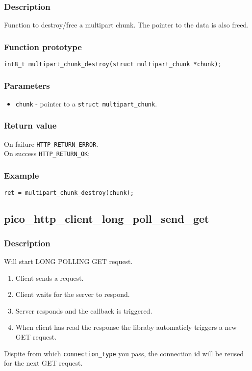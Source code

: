 \subsubsection*{Description}
Function to destroy/free a multipart chunk. The pointer to the data is also freed.

\subsubsection*{Function prototype}
\texttt{int8\_t multipart\_chunk\_destroy(struct multipart\_chunk *chunk);}

\subsubsection*{Parameters}
\begin{itemize}[noitemsep]
\item \texttt{chunk} - pointer to a \texttt{struct multipart\_chunk}.
\end{itemize}
\subsubsection*{Return value}
On failure \texttt{HTTP\_RETURN\_ERROR}.
\\On success \texttt{HTTP\_RETURN\_OK};
\subsubsection*{Example}
\begin{verbatim}
ret = multipart_chunk_destroy(chunk);
\end{verbatim}



\subsection{pico\_http\_client\_long\_poll\_send\_get}

\subsubsection*{Description}
Will start LONG POLLING GET request.
\begin{enumerate}
\item Client sends a request.
\item Client waits for the server to respond.
\item Server responds and the callback is triggered.
\item When client has read the response the libraby automaticly triggers a new GET request.
\end{enumerate}
Dispite from which \texttt{connection\_type} you pass, the connection id will be reused for the next GET request.
